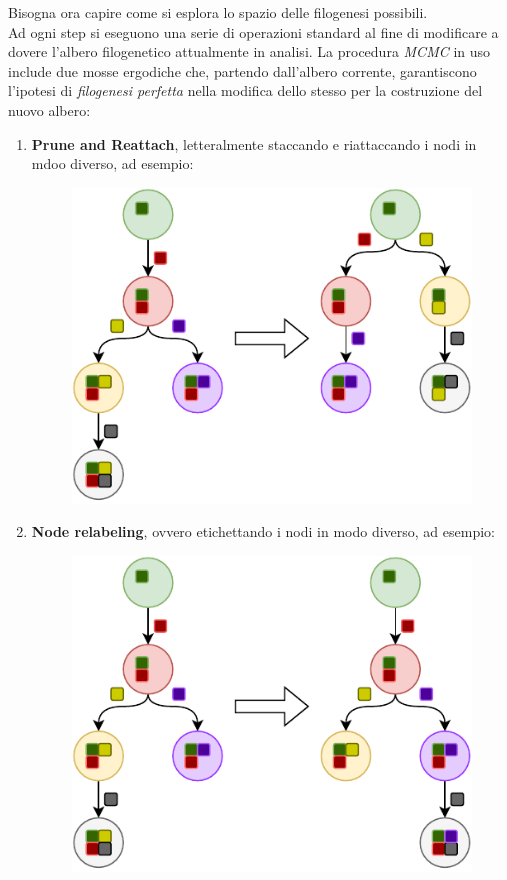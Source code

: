 \documentclass[a4paper,12pt, oneside]{book}
\begin{document}
Bisogna ora capire come si esplora lo spazio delle filogenesi possibili.\\
Ad ogni step si eseguono una serie di operazioni standard al fine di modificare
a dovere l'albero filogenetico attualmente in analisi. La procedura
\textit{MCMC} in uso include due mosse ergodiche che, partendo dall'albero
corrente, garantiscono l'ipotesi di \textit{filogenesi perfetta} nella modifica
dello stesso per la costruzione del nuovo albero:
\begin{enumerate}
  \item \textbf{Prune and Reattach}, letteralmente staccando e riattaccando i
  nodi in mdoo diverso, ad esempio:
  \begin{figure}[H]
    \centering
    \includegraphics[scale = 0.7]{img/lace1.pdf} 
  \end{figure}
  \item \textbf{Node relabeling}, ovvero etichettando i nodi in modo diverso,
  ad esempio:  
  \begin{figure}[H]
    \centering
    \includegraphics[scale = 0.7]{img/lace2.pdf} 
  \end{figure}
\end{enumerate}
\end{document}
